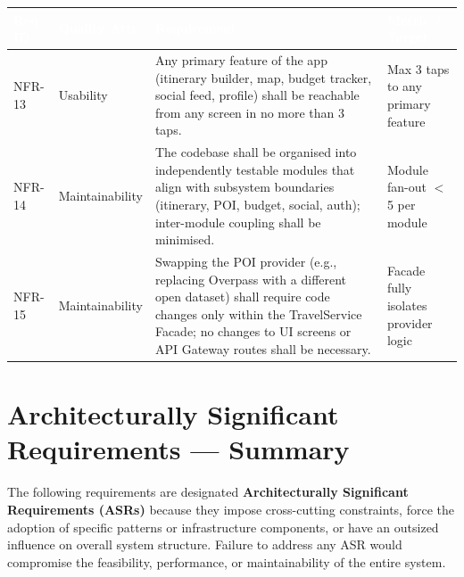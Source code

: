 \documentclass[12pt, a4paper]{article}
\newcommand{\reqid}[1]{\textsc{\small #1}}
\newcommand{\thcell}[1]{\textcolor{white}{\textbf{\small #1}}}
\begin{document}
\vspace{0.4em}
\begin{longtable}{C{1.5cm} C{2.4cm} L{7.0cm} C{2.7cm}}
\toprule
{}
\thcell{Req ID} & \thcell{Quality Attr.} & \thcell{Requirement} & \thcell{Metric / Target} \\
\midrule
\endhead
\bottomrule
\endfoot

\reqid{NFR-13} & Usability &
Any primary feature of the app (itinerary builder, map, budget tracker, social feed, profile) shall be reachable from any screen in no more than 3 taps. &
Max 3 taps to any primary feature \\

\reqid{NFR-14} & Maintainability &
The codebase shall be organised into independently testable modules that align with subsystem boundaries (itinerary, POI, budget, social, auth); inter-module coupling shall be minimised. &
Module fan-out $<$ 5 per module \\

\reqid{NFR-15} & Maintainability &
Swapping the POI provider (e.g., replacing Overpass with a different open dataset) shall require code changes only within the TravelService Facade; no changes to UI screens or API Gateway routes shall be necessary. &
Facade fully isolates provider logic \\

\end{longtable}

\section{Architecturally Significant Requirements --- Summary}

The following requirements are designated \textbf{Architecturally Significant Requirements (ASRs)} because they impose cross-cutting constraints, force the adoption of specific patterns or infrastructure components, or have an outsized influence on overall system structure. Failure to address any ASR would compromise the feasibility, performance, or maintainability of the entire system.
\end{document}
